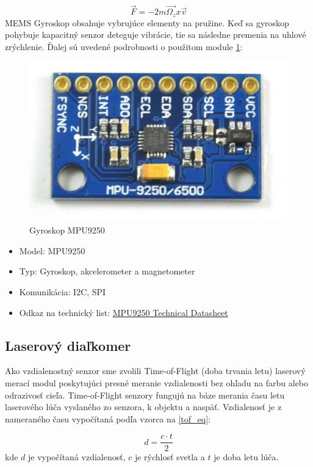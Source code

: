 \begin{equation}
\label{enc_eq}
\vec{F} = -2m\vec{\Omega_z}x\vec{v}
\end{equation}
MEMS Gyroskop obsahuje vybrujúce elementy na pružine. Keď sa gyroskop pohybuje kapacitný senzor deteguje vibrácie, tie sa následne premenia na uhlové zrýchlenie.
	\newpage
Ďalej sú uvedené podrobnosti o použitom module \ref{fig:gyro}:
\begin{figure}[!htbp]
		\centering
		\includegraphics[scale=0.8]{includes/images/mpu9205.png}
		\caption{Gyroskop MPU9250}
		\label{fig:gyro}
\end{figure}
\begin{itemize}
  \item Model: MPU9250
  \item Typ: Gyroskop, akcelerometer a magnetometer
  \item Komunikácia: I2C, SPI
  \item Odkaz na technický list: \href{https://www.invensense.com/products/motion-tracking/9-axis/mpu-9250/}{MPU9250 Technical Datasheet}
\end{itemize}
\subsection{Laserový diaľkomer}
Ako vzdialenostný senzor sme zvolili Time-of-Flight (doba trvania letu) laserový merací modul poskytujúci presné meranie vzdialenosti bez ohľadu na farbu alebo odrazivosť cieľa. 
Time-of-Flight senzory fungujú na báze merania času letu laserového lúča vyslaného zo senzora, k objektu a naspäť. Vzdialenosť je z nameraného času vypočítaná podľa vzorca na \ref{tof_eq}:

\begin{equation}
\label{tof_eq}
d = \frac{c \cdot t}{2}
\end{equation}
kde $d$ je vypočítaná vzdialenosť, $c$ je rýchlosť svetla a $t$ je doba letu lúča.

